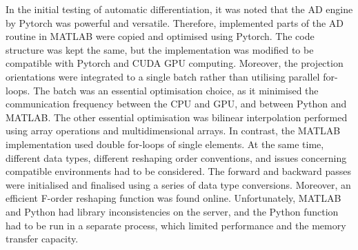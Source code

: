 In the initial testing of automatic differentiation, it was noted that the AD engine by Pytorch was powerful and versatile.
Therefore, implemented parts of the AD routine in MATLAB were copied and optimised using Pytorch.
The code structure was kept the same, but the implementation was modified to be compatible with Pytorch and CUDA GPU computing.
Moreover, the projection orientations were integrated to a single batch rather than utilising parallel for-loops. %
The batch was an essential optimisation choice, as it minimised the communication frequency between the CPU and GPU, and between Python and MATLAB.
The other essential optimisation was bilinear interpolation performed using array operations and multidimensional arrays.
In contrast, the MATLAB implementation used double for-loops of single elements.
At the same time, different data types, different reshaping order conventions, and issues concerning compatible environments had to be considered.
The forward and backward passes were initialised and finalised using a series of data type conversions.
Moreover, an efficient F-order reshaping function was found online.
Unfortunately, MATLAB and Python had library inconsistencies on the server,
and the Python function had to be run in a separate process, which limited performance and the memory transfer capacity.

